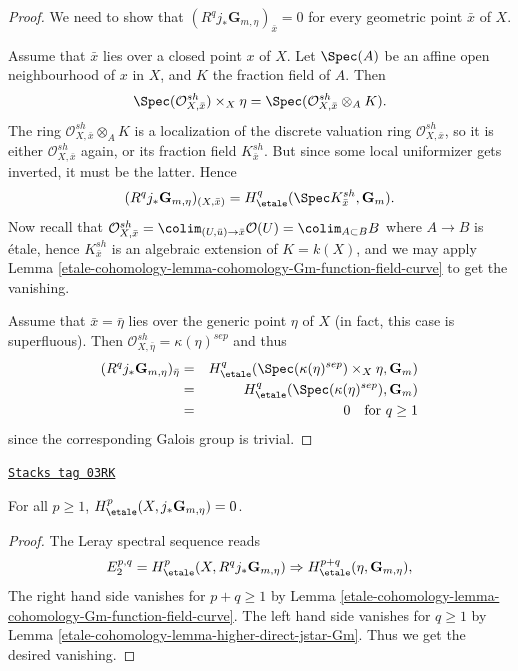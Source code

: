 \begin{proof}
We need to show that $(R^q j_*\mathbf{G}_{m, \eta})_{\bar x} = 0$ for every
geometric point $\bar x$ of $X$.

\medskip\noindent
Assume that $\bar x$ lies over a closed point $x$ of $X$. Let $\Spec(A)$
be an affine open neighbourhood of $x$ in $X$, and $K$ the fraction field
of $A$. Then
$$
\Spec(\mathcal{O}^{sh}_{X, \bar x}) \times_X \eta =
\Spec(\mathcal{O}^{sh}_{X, \bar x} \otimes_A K).
$$
The ring $\mathcal{O}^{sh}_{X, \bar x} \otimes_A K$ is a localization of
the discrete valuation ring $\mathcal{O}^{sh}_{X, \bar x}$, so it is either
$\mathcal{O}^{sh}_{X, \bar x}$ again, or its fraction field
$K^{sh}_{\bar x}$. But since some local uniformizer gets inverted, it must
be the latter. Hence
$$
(R^q j_*\mathbf{G}_{m, \eta})_{(X, \bar x)} = H_\etale^q(\Spec
K^{sh}_{\bar x}, \mathbf{G}_m).
$$
Now recall that $\mathcal{O}^{sh}_{X, \bar x} =
\colim_{(U, \bar u) \to \bar x} \mathcal{O}(U) = \colim_{A \subset B} B$
where $A \to B$ is \'etale, hence $K^{sh}_{\bar x}$ is an algebraic
extension of $K = k(X)$, and we may apply
Lemma \ref{etale-cohomology-lemma-cohomology-Gm-function-field-curve}
to get the vanishing.

\medskip\noindent
Assume that $\bar x = \bar \eta$ lies over the generic point $\eta$ of $X$ (in
fact, this case is superfluous). Then
$\mathcal{O}^{sh}_{X, \bar \eta} = \kappa(\eta)^{sep}$ and thus
\begin{eqnarray*}
(R^q j_*\mathbf{G}_{m, \eta})_{\bar \eta}
& = &
H_\etale^q(\Spec(\kappa(\eta)^{sep}) \times_X \eta, \mathbf{G}_m) \\
& = & H_\etale^q (\Spec(\kappa(\eta)^{sep}), \mathbf{G}_m) \\
& = & 0 \ \ \text{ for } q \geq 1
\end{eqnarray*}
since the corresponding Galois group is trivial.
\end{proof}

\begin{lemma}
\label{etale-cohomology-lemma-cohomology-jstar-Gm}
\href{https://stacks.math.columbia.edu/tag/03RK}{\texttt{Stacks tag 03RK}}

For all $p \geq 1$, $H_\etale^p(X, j_*\mathbf{G}_{m, \eta}) = 0$.
\end{lemma}

\begin{proof}
The Leray spectral sequence reads
$$
E_2^{p, q} = H_\etale^p(X, R^qj_*\mathbf{G}_{m, \eta}) \Rightarrow
H_\etale^{p+q}(\eta, \mathbf{G}_{m, \eta}),
$$
The right hand side vanishes for $p + q \geq 1$ by
Lemma \ref{etale-cohomology-lemma-cohomology-Gm-function-field-curve}.
The left hand side vanishes for $q \geq 1$ by
Lemma \ref{etale-cohomology-lemma-higher-direct-jstar-Gm}. Thus we get the desired vanishing.
\end{proof}

